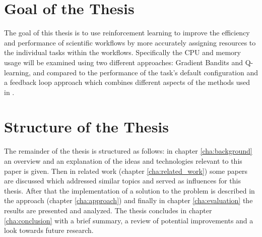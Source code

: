 
\section{Goal of the Thesis}
\label{sec:goal}

The goal of this thesis is to use reinforcement learning to improve the efficiency and performance of scientific workflows by more accurately assigning resources to the individual tasks within the workflows. Specifically the CPU and memory usage will be examined using two different approaches: Gradient Bandits and Q-learning, and compared to the performance of the task's default configuration and a feedback loop approach which combines different aspects of the methods used in \cite{tovarjob,FeedbackBasedAllocation}.

\section{Structure of the Thesis}
\label{sec:structure}

The remainder of the thesis is structured as follows: in chapter \ref{cha:background} an overview and an explanation of the ideas and technologies relevant to this paper is given. Then in related work (chapter \ref{cha:related_work}) some papers are discussed which addressed similar topics and served as influences for this thesis. After that the implementation of a solution to the problem is described in the approach (chapter \ref{cha:approach}) and finally in chapter \ref{cha:evaluation} the results are presented and analyzed. The thesis concludes in chapter \ref{cha:conclusion} with a brief summary, a review of potential improvements and a look towards future research.
